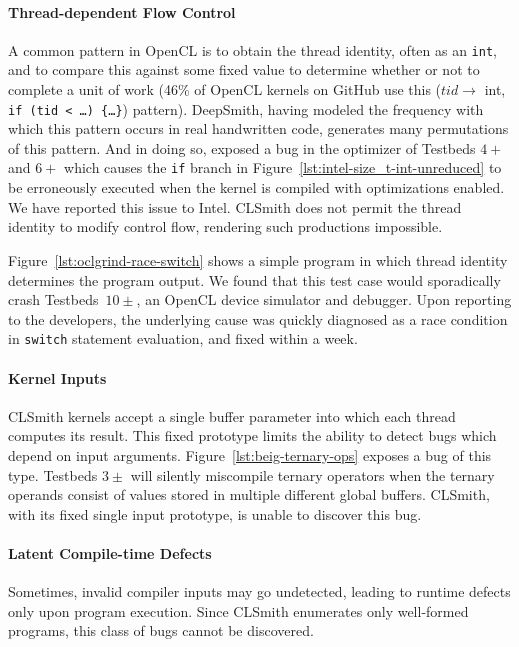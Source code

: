 \paragraph{Thread-dependent Flow Control}

A common pattern in OpenCL is to obtain the thread identity, often as an
\texttt{int}, and to compare this against some fixed value to determine whether
or not to complete a unit of work (46\% of OpenCL kernels on GitHub use this
($tid \rightarrow$ int, \texttt{if (tid < \ldots) \{\ldots\}}) pattern).
DeepSmith, having modeled the frequency with which this pattern occurs in real
handwritten code, generates many permutations of this pattern. And in doing so,
exposed a bug in the optimizer of Testbeds $4+$ and $6+$ which causes the
\texttt{if} branch in Figure~\ref{lst:intel-size_t-int-unreduced} to be
erroneously executed when the kernel is compiled with optimizations enabled. We
have reported this issue to Intel. CLSmith does not permit the thread identity
to modify control flow, rendering such productions impossible.

Figure~\ref{lst:oclgrind-race-switch} shows a simple program in which thread
identity determines the program output. We found that this test case would
sporadically crash Testbeds~$10\pm$, an OpenCL device simulator and debugger.
Upon reporting to the developers, the underlying cause was quickly diagnosed as
a race condition in \texttt{switch} statement evaluation, and fixed within a
week.

\paragraph{Kernel Inputs}

CLSmith kernels accept a single buffer parameter into which each thread computes
its result. This fixed prototype limits the ability to detect bugs which depend
on input arguments. Figure~\ref{lst:beig-ternary-ops} exposes a bug of this
type. Testbeds $3\pm$ will silently miscompile ternary operators when the
ternary operands consist of values stored in multiple different global buffers.
CLSmith, with its fixed single input prototype, is unable to discover this bug.

\paragraph{Latent Compile-time Defects}

Sometimes, invalid compiler inputs may go undetected, leading to runtime defects
only upon program execution. Since CLSmith enumerates only well-formed programs,
this class of bugs cannot be discovered.

